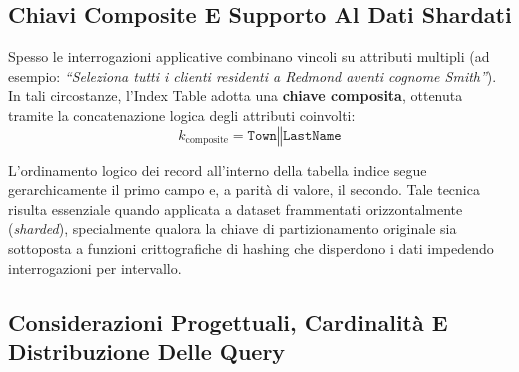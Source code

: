 \documentclass[11pt, a4paper]{article}
\begin{document}
\subsection{Chiavi Composite E Supporto Al Dati Shardati}

Spesso le interrogazioni applicative combinano vincoli su attributi multipli (ad esempio: \emph{``Seleziona tutti i clienti residenti a Redmond aventi cognome Smith''}). In tali circostanze, l'Index Table adotta una \textbf{chiave composita}, ottenuta tramite la concatenazione logica degli attributi coinvolti:
\[
k_{\text{composite}} = \texttt{Town} \mathbin{\Vert} \texttt{LastName}
\]


L'ordinamento logico dei record all'interno della tabella indice segue gerarchicamente il primo campo e, a parità di valore, il secondo. Tale tecnica risulta essenziale quando applicata a dataset frammentati orizzontalmente (\emph{sharded}), specialmente qualora la chiave di partizionamento originale sia sottoposta a funzioni crittografiche di hashing che disperdono i dati impedendo interrogazioni per intervallo.

\subsection{Considerazioni Progettuali, Cardinalità E Distribuzione Delle Query}
\end{document}
